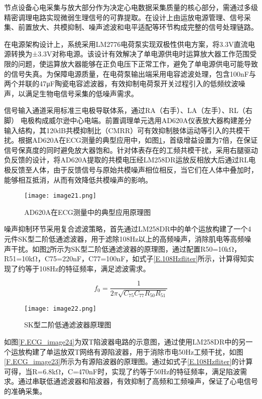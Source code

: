 节点设备心电采集与放大部分作为决定心电数据采集质量的核心部分，需通过多级精密调理电路实现微弱生理信号的可靠提取。在设计上由运放电源管理、信号采集、前置放大、共模抑制、噪声滤波和电平适配等环节构成完整的信号处理链路。

在电源架构设计上，系统采用LM2776电荷泵实现双极性供电方案，将3.3V直流电源转换为±3.3V对称电源。该设计有效解决了单电源供电时运算放大器工作范围受限的问题，使运算放大器能够在正负电压下正常工作，避免了单电源供电可能导致的信号失真。为保障电源质量，在电荷泵输出端采用电容滤波处理，包含100nF与两个并联的47μF陶瓷电容滤波器，有效抑制电荷泵开关过程引入的低频纹波噪声，以满足生物电信号采集的低噪声需求。

信号输入通道采用标准三电极导联体系，通过RA（右手）、LA（左手）、RL（右脚） 电极构成威尔逊中心电端。前置调理单元选用AD620A仪表放大器构建差分输入结构，其120dB共模抑制比（CMRR）可有效抑制肢体运动等引入的共模干扰。根据AD620A在ECG测量的典型应用中，如图\ref{F.ECG_image21}，首级增益设置为7倍，在保证信号保真度的同时避免放大器饱和。针对体表存在的工频共模干扰，采用右腿驱动负反馈的设计，将AD620A提取的共模电压经LM258DR运放反相放大后通过RL电极反馈至人体，由于反馈信号与原始共模噪声相位相反，当它们在人体中叠加时，能够相互抵消，从而有效降低共模噪声的影响。

\begin{figure}[H]
    \centering
    \texttt{[image: image21.png]}
    \caption{AD620A在ECG测量中的典型应用原理图\cite{AD620A}}
    \label{F.ECG_image21}
\end{figure}


噪声抑制环节采用复合滤波策略，首先通过LM258DR中的单个运放构建了一个4元件SK型二阶低通滤波器，用于滤除108Hz以上的高频噪声，消除肌电等高频噪声干扰。如图\ref{F.ECG_image22}所示为SK型二阶低通滤波器的原理图，通过配置R50=10kΩ，R51=10kΩ，C75=220nF，C77=100nF，如式子\ref{E.108Hzfliter}所示，计算得知实现了约等于108Hz的特征频率，满足滤波需求。

\begin{equation}
    f_{0}=\frac{1}{2 \pi \sqrt{C_{75} C_{77} R_{50} R_{51}}}
\label{E.108Hzfliter}
\end{equation}

\begin{figure}[hbt]
    \centering
    \texttt{[image: image22.png]}
    \caption{SK型二阶低通滤波器原理图}
    \label{F.ECG_image22}
\end{figure}

如图\ref{F.ECG_image24}为双T陷波器电路的示意图，通过使用LM258DR中的另一个运放构建了单运放双T网络有源陷波器，用于消除市电50Hz工频干扰，如图\ref{F.ECG_image23}所示为有源陷波器的原理图。通过如式子\ref{E.108Hzfliter}的计算可得，当R=6.8kΩ，C=470nF时，实现了约等于50Hz的特征频率，满足陷波需求。通过串联低通滤波器和陷波器，有效抑制了高频和工频噪声，保证了心电信号的准确采集。

